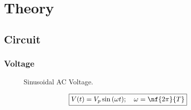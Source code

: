 \chapter{Theory}




\section{Circuit}


\subsection{Voltage}

\begin{figure}[h]
  \centering
  \label{fig:sinusoidal-ac-voltage}
  \caption[Sinusoidal AC Voltage]{Sinusoidal AC Voltage.}
\end{figure}

\[
  \boxed{ V(t) = V_p \sin{(\omega t)}; \quad  \omega = \nf{2\pi}{T}}
\]

